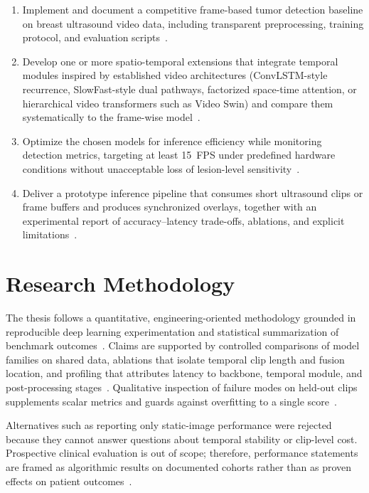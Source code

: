 \documentclass[
english,                 %
bibtex,                  %
]{kththesis}
\numberwithin{listing}{chapter}
\begin{document}
\begin{enumerate}
  \item Implement and document a competitive frame-based tumor detection baseline on breast ultrasound video data, including transparent preprocessing, training protocol, and evaluation scripts~\cite{lin2022_buv_miccai,redmon2018_yolov3,lin2017_focal_loss_retinanet}.
  \item Develop one or more spatio-temporal extensions that integrate temporal modules inspired by established video architectures (ConvLSTM-style recurrence, SlowFast-style dual pathways, factorized space-time attention, or hierarchical video transformers such as Video Swin) and compare them systematically to the frame-wise model~\cite{shi2015_convlstm,feichtenhofer2019_slowfast,bertasius2021_spacetime_attention,liu2022_video_swin_transformer}.
  \item Optimize the chosen models for inference efficiency while monitoring detection metrics, targeting at least \SI{15}{FPS} under predefined hardware conditions without unacceptable loss of lesion-level sensitivity~\cite{liu2023_edgemednet}.
  \item Deliver a prototype inference pipeline that consumes short ultrasound clips or frame buffers and produces synchronized overlays, together with an experimental report of accuracy--latency trade-offs, ablations, and explicit limitations~\cite{lin2022_buv_miccai}.
\end{enumerate}

\section{Research Methodology}

The thesis follows a quantitative, engineering-oriented methodology grounded in reproducible deep learning experimentation and statistical summarization of benchmark outcomes~\cite{litjens2017_survey_deep_medical,dan2024_breast_us_dl_review}.
Claims are supported by controlled comparisons of model families on shared data, ablations that isolate temporal clip length and fusion location, and profiling that attributes latency to backbone, temporal module, and post-processing stages~\cite{liu2023_edgemednet}.
Qualitative inspection of failure modes on held-out clips supplements scalar metrics and guards against overfitting to a single score~\cite{dan2024_breast_us_dl_review}.

Alternatives such as reporting only static-image performance were rejected because they cannot answer questions about temporal stability or clip-level cost.
Prospective clinical evaluation is out of scope; therefore, performance statements are framed as algorithmic results on documented cohorts rather than as proven effects on patient outcomes~\cite{dan2024_breast_us_dl_review}.
\end{document}
